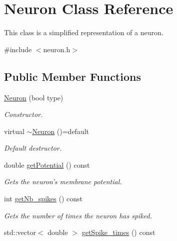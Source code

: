 \hypertarget{classNeuron}{\section{Neuron Class Reference}
\label{classNeuron}
}


This class is a simplified representation of a neuron.  




{\ttfamily \#include $<$neuron.\-h$>$}

\subsection*{Public Member Functions}
\begin{DoxyCompactItemize}
\item 
\hyperlink{classNeuron_abf563ce9a022d8b3f6903a7f14f904e6}{Neuron} (bool type)
\begin{DoxyCompactList}\small\item\em Constructor. \end{DoxyCompactList}\item 
\hypertarget{classNeuron_a3a5fcd8290aabb7cadb1228e885d3c6c}{virtual \hyperlink{classNeuron_a3a5fcd8290aabb7cadb1228e885d3c6c}{$\sim$\-Neuron} ()=default}\label{classNeuron_a3a5fcd8290aabb7cadb1228e885d3c6c}

\begin{DoxyCompactList}\small\item\em Default destructor. \end{DoxyCompactList}\item 
\hypertarget{classNeuron_ae2bc004a58621da0d1c51591400ca87d}{double \hyperlink{classNeuron_ae2bc004a58621da0d1c51591400ca87d}{get\-Potential} () const }\label{classNeuron_ae2bc004a58621da0d1c51591400ca87d}

\begin{DoxyCompactList}\small\item\em Gets the neuron's membrane potential. \end{DoxyCompactList}\item 
\hypertarget{classNeuron_a819c2d29d2a7600e4a78ef3de29528a5}{int \hyperlink{classNeuron_a819c2d29d2a7600e4a78ef3de29528a5}{get\-Nb\-\_\-spikes} () const }\label{classNeuron_a819c2d29d2a7600e4a78ef3de29528a5}

\begin{DoxyCompactList}\small\item\em Gets the number of times the neuron has spiked. \end{DoxyCompactList}\item 
\hypertarget{classNeuron_a1975b65fc4e897315e42035f473a1d9d}{std\-::vector$<$ double $>$ \hyperlink{classNeuron_a1975b65fc4e897315e42035f473a1d9d}{get\-Spike\-\_\-times} () const }\label{classNeuron_a1975b65fc4e897315e42035f473a1d9d}


\end{DoxyCompactItemize}
